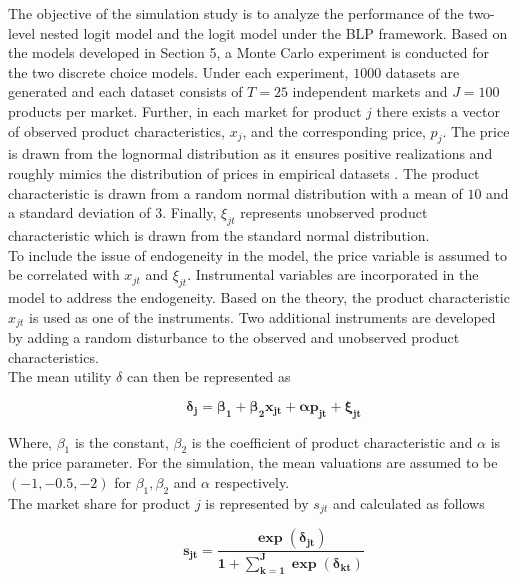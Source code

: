 \documentclass[a4paper,11pt]{article}
\begin{document}
    The objective of the simulation study is to analyze the performance of the two-level nested logit model and the logit model under the BLP framework. Based on the models developed in Section 5, a Monte Carlo experiment is conducted for the two discrete choice models. Under each experiment, $1000$ datasets are generated and each dataset consists of $T = 25$ independent markets and $J = 100$ products per market. Further, in each market for product $j$ there exists a vector of observed product characteristics, $x_{j}$, and the corresponding price, $p_{j}$. The price is drawn from the lognormal distribution as it ensures positive realizations and roughly mimics the distribution of prices in empirical datasets \cite{Grigolon&Verboven}. The product characteristic is drawn from a random normal distribution with a mean of $10$ and a standard deviation of $3$.  Finally, $\xi_{jt}$ represents unobserved product characteristic which is drawn from the standard normal distribution.\\

    To include the issue of endogeneity in the model, the price variable is assumed to be correlated with $x_{jt}$ and $\xi_{jt}$. Instrumental variables are incorporated in the model to address the endogeneity. Based on the theory, the product characteristic $x_{jt}$ is used as one of the instruments. Two additional instruments are developed by adding a random disturbance to the observed and unobserved product characteristics.\\

    The mean utility $\delta$ can then be represented as

    \begin{equation*}
        \qquad \mathbf{\delta_{j} = \beta_{1} + \beta_{2} x_{jt} + \alpha p_{jt} + \xi_{jt}}
    \end{equation*}

    Where, $\beta_{1}$ is the constant, $\beta_{2}$ is the coefficient of  product characteristic and $\alpha$ is the price parameter. For the simulation, the mean valuations are assumed to be $(-1,-0.5,-2)$ for $\beta_{1},\beta_{2}$ and $\alpha$ respectively.\\

    The market share for product $j$ is represented by $s_{jt}$ and calculated as follows 

    \begin{equation*}
        \qquad \mathbf{s_{jt} = \dfrac{\exp(\delta_{jt})}{1 + \sum_{k=1}^{J}\exp(\delta_{kt})}}
    \end{equation*}
\end{document}
